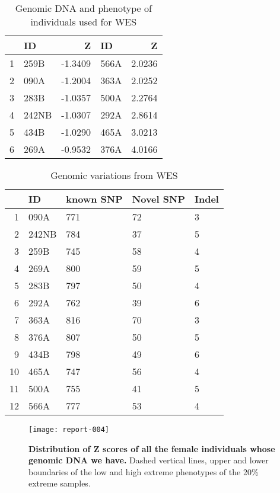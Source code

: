 \documentclass{article}
\begin{document}
\begin{table}[tbp]
\centering
\caption{Genomic DNA and phenotype of individuals used for WES} 
\label{tab:female}
\begin{tabular}{rlrlr}
  \hline
 & ID & Z & ID & Z \\ 
  \hline
1 & 259B & -1.3409 & 566A & 2.0236 \\ 
  2 & 090A & -1.2004 & 363A & 2.0252 \\ 
  3 & 283B & -1.0357 & 500A & 2.2764 \\ 
  4 & 242NB & -1.0307 & 292A & 2.8614 \\ 
  5 & 434B & -1.0290 & 465A & 3.0213 \\ 
  6 & 269A & -0.9532 & 376A & 4.0166 \\ 
   \hline
\end{tabular}
\end{table}
\begin{table}[tbp]
\centering
\caption{Genomic variations from WES} 
\label{tab:whole}
{\small
\begin{tabular}{rllll}
  \hline
 & ID & known SNP & Novel SNP & Indel \\ 
  \hline
1 & 090A & 771 & 72 & 3 \\ 
  2 & 242NB & 784 & 37 & 5 \\ 
  3 & 259B & 745 & 58 & 4 \\ 
  4 & 269A & 800 & 59 & 5 \\ 
  5 & 283B & 797 & 50 & 4 \\ 
  6 & 292A & 762 & 39 & 6 \\ 
  7 & 363A & 816 & 70 & 3 \\ 
  8 & 376A & 807 & 50 & 5 \\ 
  9 & 434B & 798 & 49 & 6 \\ 
  10 & 465A & 747 & 56 & 4 \\ 
  11 & 500A & 755 & 41 & 5 \\ 
  12 & 566A & 777 & 53 & 4 \\ 
   \hline
\end{tabular}
}
\end{table}

\begin{figure}[htb]
\centering
\texttt{[image: report-004]}

\caption{{\bf {Distribution of Z scores of all the female individuals whose genomic DNA we have.}} Dashed vertical lines, upper and lower boundaries of the low and high extreme phenotypes of the 20\% extreme samples.}
\label{fig:zdistr}
\end{figure}
\end{document}
